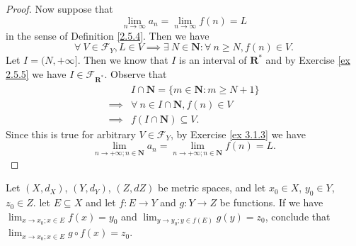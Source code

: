 \begin{proof}
    Now suppose that
    \[
        \lim_{n \to \infty} a_n = \lim_{n \to \infty} f(n) = L
    \]
    in the sense of Definition \ref{2.5.4}.
    Then we have
    \[
        \forall\ V \in \mathcal{F}_Y, L \in V \implies \exists\ N \in \mathbf{N} : \forall\ n \geq N, f(n) \in V.
    \]
    Let \(I = (N, +\infty]\).
    Then we know that \(I\) is an interval of \(\mathbf{R}^*\) and by Exercise \ref{ex 2.5.5} we have \(I \in \mathcal{F}_{\mathbf{R}^*}\).
    Observe that
    \begin{align*}
                 & I \cap \mathbf{N} = \{m \in \mathbf{N} : m \geq N + 1\} \\
        \implies & \forall\ n \in I \cap \mathbf{N}, f(n) \in V            \\
        \implies & f(I \cap \mathbf{N}) \subseteq V.
    \end{align*}
    Since this is true for arbitrary \(V \in \mathcal{F}_Y\), by Exercise \ref{ex 3.1.3} we have
    \[
        \lim_{n \to +\infty ; n \in \mathbf{N}} a_n = \lim_{n \to +\infty ; n \in \mathbf{N}} f(n) = L.
    \]
\end{proof}

\begin{exercise}\label{ex 3.1.5}
    Let \((X, d_X)\), \((Y, d_Y)\), \((Z, d Z)\) be metric spaces, and let \(x_0 \in X\), \(y_0 \in Y\), \(z_0 \in Z\).
    let \(E \subseteq X\) and let \(f : E \to Y\) and \(g : Y \to Z\) be functions.
    If we have \(\lim_{x \to x_0 ; x \in E} f(x) = y_0\) and \(\lim_{y \to y_0 ; y \in f(E)} g(y) = z_0\), conclude that \(\lim_{x \to x_0 ; x \in E} g \circ f(x) = z_0\).
\end{exercise}

